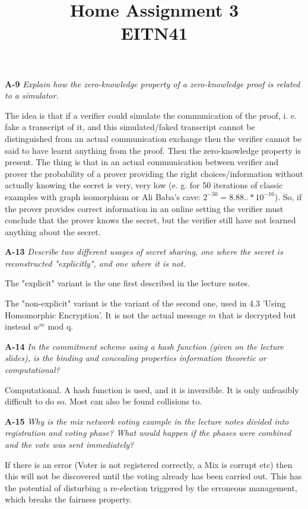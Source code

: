 \documentclass[a4paper]{article}
\title{Home Assignment 3 \\ EITN41}
\author{}
\date{}
\newcommand{\Q}[2]{ \vspace{10pt} \textbf{A-#1} \textit{#2} }
\newcommand{\A}[1]{ #1 }
\begin{document}
\maketitle

\Q{9} {
  Explain how the zero-knowledge property of a zero-knowledge proof is related to a simulator.
}

\A{
  The idea is that if a verifier could simulate the communication of the proof,
  i. e. fake a transcript of it, and this simulated/faked transcript cannot 
  be distinguished from an actual communication exchange then the verifier
  cannot be said to have learnt anything from the proof. Then the 
  zero-knowledge property is present. The thing is that in an actual
  communication between verifier and prover the probability of a prover
  providing the right choices/information without actually knowing the secret 
  is very, very low 
  (e. g. for 50 iterations of classic examples with graph isomorphism
  or Ali Baba's cave: $2^{-50} = 8.88.. * 10^{-16}$). So, if the prover
  provides correct information in an online setting the verifier
  must conclude that the prover knows the secret, but the verifier still
  have not learned anything about the secret. 
}

\Q{13} {
  Describe two different usages of secret sharing, one where the secret is reconstructed "explicitly", and one where it is not.
}

\A{
  The "explicit" variant is the one first described in the lecture notes.
  
  The "non-explicit" variant is the variant of the second one, used in
  4.3 'Using Homomorphic Encryption'. 
  It is not the actual message $m$ that is decrypted but instead $w^m$ mod q.
}

\Q{14} {
  In the commitment scheme using a hash function (given on the lecture slides),
  is the \textnormal{binding} and
  \textnormal{concealing} properties information theoretic or computational?
}

\A{
  Computational. A hash function is used, and it is inversible. 
  It is only unfeasibly difficult to do so. 
  Most can also be found collisions to.
}

\Q{15} {
  Why is the mix network voting example in the lecture notes divided into 
  registration and voting
  phase? What would happen if the phases were combined and the vote was sent 
  immediately?
}

\A{
  If there is an error (Voter is not registered correctly, a Mix is corrupt etc) then this will 
  not be discovered until the voting already has been carried out. 
  This has the potential of disturbing a re-election triggered by the
  erroneous management, which breaks the fairness property.
}
\end{document}
